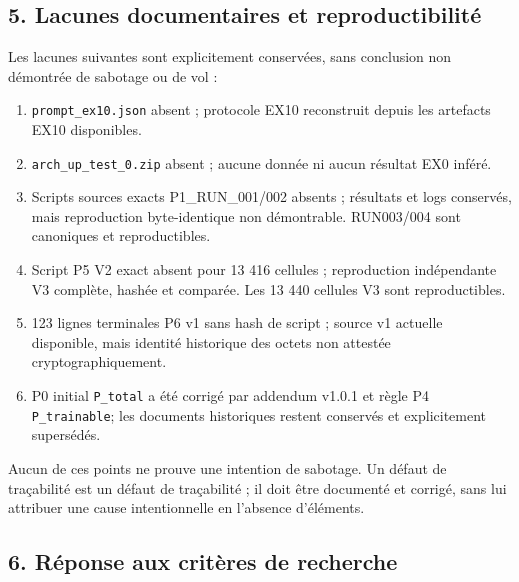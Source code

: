 \documentclass[
]{article}
\providecommand{\tightlist}{%
  \setlength{\itemsep}{0pt}\setlength{\parskip}{0pt}}
\begin{document}
\subsection{5. Lacunes documentaires et
reproductibilité}\label{lacunes-documentaires-et-reproductibilituxe9}

Les lacunes suivantes sont explicitement conservées, sans conclusion non
démontrée de sabotage ou de vol :

\begin{enumerate}
\def\labelenumi{\arabic{enumi}.}
\tightlist
\item
  \texttt{prompt\_ex10.json} absent ; protocole EX10 reconstruit depuis
  les artefacts EX10 disponibles.
\item
  \texttt{arch\_up\_test\_0.zip} absent ; aucune donnée ni aucun
  résultat EX0 inféré.
\item
  Scripts sources exacts P1\_RUN\_001/002 absents ; résultats et logs
  conservés, mais reproduction byte-identique non démontrable.
  RUN003/004 sont canoniques et reproductibles.
\item
  Script P5 V2 exact absent pour 13 416 cellules ; reproduction
  indépendante V3 complète, hashée et comparée. Les 13 440 cellules V3
  sont reproductibles.
\item
  123 lignes terminales P6 v1 sans hash de script ; source v1 actuelle
  disponible, mais identité historique des octets non attestée
  cryptographiquement.
\item
  P0 initial \texttt{P\_total} a été corrigé par addendum v1.0.1 et
  règle P4 \texttt{P\_trainable}; les documents historiques restent
  conservés et explicitement supersédés.
\end{enumerate}

Aucun de ces points ne prouve une intention de sabotage. Un défaut de
traçabilité est un défaut de traçabilité ; il doit être documenté et
corrigé, sans lui attribuer une cause intentionnelle en l'absence
d'éléments.

\subsection{6. Réponse aux critères de
recherche}\label{ruxe9ponse-aux-crituxe8res-de-recherche}
\end{document}
